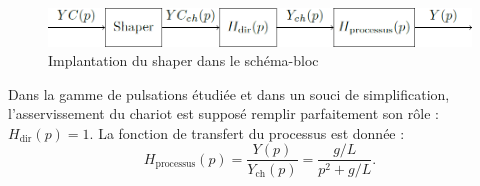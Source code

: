 \documentclass[10pt,fleqn]{article} %
\begin{document}
\begin{figure}[H]
\centering
\includegraphics[width=\linewidth]{images/fig_15}
\caption{Implantation du shaper dans le schéma-bloc \label{fig_15}}
\end{figure}

Dans la gamme de pulsations étudiée et dans un souci de simplification, l’asservissement du chariot est supposé
remplir parfaitement son rôle : $H_{\text{dir}}(p) = 1$. La fonction de transfert du processus est donnée :
$$
H_{\text{processus}}(p) = \dfrac{Y(p)}{Y_{\text{ch}}(p)}= \dfrac{g/L}{p^2 + g/L}.
$$

\subparagraph{\label{q22}}\textit{}
\subparagraph{\label{q23}}\textit{}
\subparagraph{\label{q24}}\textit{}
\subparagraph{\label{q25}}\textit{}
\subparagraph{\label{q26}}\textit{}
\subparagraph{\label{q27}}\textit{}
\subparagraph{\label{q28}}\textit{}
\end{document}
